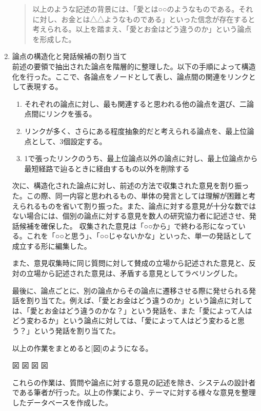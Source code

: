 \documentclass[11pt, a4paper]{jreport} %
\begin{document}
\begin{enumerate}
\begin{quote}
以上のような記述の背景には、「愛とは○○のようなものである。それに対し、お金とは△△ようなものである」といった信念が存在すると考えられる。以上を踏まえ、「愛とお金はどう違うのか」という論点を形成した。
\end{quote}

\item  論点の構造化と発話候補の割り当て\\
前述の要領で抽出された論点を階層的に整理した。以下の手順によって構造化を行った。ここで、各論点をノードとして表し、論点間の関連をリンクとして表現する。
\begin{enumerate}
\renewcommand{\labelenumii}{(\arabic{enumii}).}
\item それぞれの論点に対し、最も関連すると思われる他の論点を選び、二論点間にリンクを張る。
\item リンクが多く、さらにある程度抽象的だと考えられる論点を、最上位論点として、3個設定する。
\item 1で張ったリンクのうち、最上位論点以外の論点に対し、最上位論点から最短経路で辿るときに経由するもの以外を削除する
\end{enumerate}


次に、構造化された論点に対し、前述の方法で収集された意見を割り振った。この際、同一内容と思われるもの、単体の発言としては理解が困難と考えられるものを省いて割り振った。また、論点に対する意見が十分な数ではない場合には、個別の論点に対する意見を数人の研究協力者に記述させ、発話候補を確保した。
収集された意見は「○○から」で終わる形になっている。これを「○○と思う」、「○○じゃないかな」といった、単一の発話として成立する形に編集した。



また、意見収集時に同じ質問に対して賛成の立場から記述された意見と、反対の立場から記述された意見は、矛盾する意見としてラベリングした。%


最後に、論点ごとに、別の論点からその論点に遷移させる際に発せられる発話を割り当てた。例えば、「愛とお金はどう違うのか」という論点に対しては、「愛とお金はどう違うのかな？」という発話を、また「愛によって人はどう変わるか」という論点に対しては、「愛によって人はどう変わると思う？」という発話を割り当てた。


以上の作業をまとめると[図]のようになる。

図
図
図
図


これらの作業は、質問や論点に対する意見の記述を除き、システムの設計者である筆者が行った。以上の作業により、テーマに対する様々な意見を整理したデータベースを作成した。
\end{enumerate}
\end{document}
